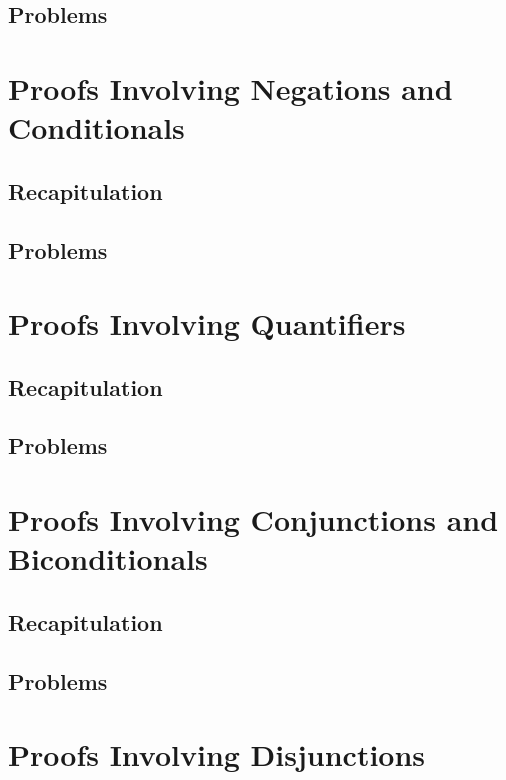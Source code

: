 \documentclass{report}
\begin{document}
        \subsection{Problems}
        
    \section{Proofs Involving Negations and Conditionals}
        \subsection{Recapitulation}
        
        \subsection{Problems}
        
    \section{Proofs Involving Quantifiers}
        \subsection{Recapitulation}
        
        \subsection{Problems}
        
    \section{Proofs Involving Conjunctions and Biconditionals}
        \subsection{Recapitulation}
        
        \subsection{Problems}
        
    \section{Proofs Involving Disjunctions}
\end{document}
